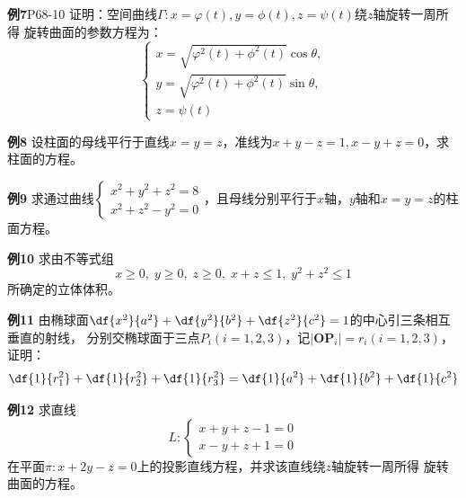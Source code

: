 \begin{frame}
	\linespread{1.2}
	\begin{exampleblock}{{\bf 例7}\hfill P68-10}
		证明：空间曲线$\Gamma:x=\varphi(t),y=\phi(t),z=\psi(t)$绕$z$轴旋转一周所得
		旋转曲面的参数方程为：
		$$\left\{\begin{array}{l}
			x=\sqrt{\varphi^2(t)+\phi^2(t)}\cos\theta,\\
			y=\sqrt{\varphi^2(t)+\phi^2(t)}\sin\theta,\\
			z=\psi(t)
		\end{array}\right.$$
	\end{exampleblock}
\end{frame}

\begin{frame}
	\linespread{1.5}
	\begin{exampleblock}{{\bf 例8}\hfill}
		设柱面的母线平行于直线$x=y=z$，准线为$x+y-z=1,x-y+z=0$，求柱面的方程。
	\end{exampleblock}\pause
	\bigskip
	\begin{exampleblock}{{\bf 例9}\hfill}
		求通过曲线$\left\{\begin{array}{l}
			x^2+y^2+z^2=8\\
			x^2+z^2-y^2=0
		\end{array}\right.$，且母线分别平行于$x$轴，$y$轴和$x=y=z$的柱面方程。
	\end{exampleblock}
\end{frame}

\begin{frame}
	\linespread{1.2}
	\begin{exampleblock}{{\bf 例10}\hfill}
		求由不等式组
		$$x\geq 0,\;y\geq 0,\;z\geq 0,\;x+z\leq 1,\; y^2+z^2\leq 1$$
		所确定的立体体积。
	\end{exampleblock}
\end{frame}

\begin{frame}
	\linespread{1.5}
	\begin{exampleblock}{{\bf 例11}\hfill}
		由椭球面$\df{x^2}{a^2}+\df{y^2}{b^2}+\df{z^2}{c^2}=1$的中心引三条相互垂直的射线，
		分别交椭球面于三点$P_i(i=1,2,3)$，记$|\bm{OP}_i|=r_i(i=1,2,3)$，证明：
		$$\df{1}{r_1^2}+\df{1}{r_2^2}+\df{1}{r_3^2}
		=\df{1}{a^2}+\df{1}{b^2}+\df{1}{c^2}$$
	\end{exampleblock}
\end{frame}

\begin{frame}
	\linespread{1.2}
	\begin{exampleblock}{{\bf 例12}\hfill}
		求直线
		$$L:\left\{\begin{array}{l}
			x+y+z-1=0\\
			x-y+z+1=0
		\end{array}\right.$$
		在平面$\pi:x+2y-z=0$上的投影直线方程，并求该直线绕$z$轴旋转一周所得
		旋转曲面的方程。
	\end{exampleblock}
\end{frame}

